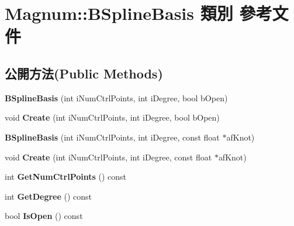 \hypertarget{class_magnum_1_1_b_spline_basis}{}\section{Magnum\+:\+:B\+Spline\+Basis 類別 參考文件}
\label{class_magnum_1_1_b_spline_basis}
\subsection*{公開方法(Public Methods)}
\begin{DoxyCompactItemize}
\item 
{\bfseries B\+Spline\+Basis} (int i\+Num\+Ctrl\+Points, int i\+Degree, bool b\+Open)\hypertarget{class_magnum_1_1_b_spline_basis_a49f9d1a3059e81d71e17940717570d98}{}\label{class_magnum_1_1_b_spline_basis_a49f9d1a3059e81d71e17940717570d98}

\item 
void {\bfseries Create} (int i\+Num\+Ctrl\+Points, int i\+Degree, bool b\+Open)\hypertarget{class_magnum_1_1_b_spline_basis_ac5290de6ab3f20b5943bf196a4bc644d}{}\label{class_magnum_1_1_b_spline_basis_ac5290de6ab3f20b5943bf196a4bc644d}

\item 
{\bfseries B\+Spline\+Basis} (int i\+Num\+Ctrl\+Points, int i\+Degree, const float $\ast$af\+Knot)\hypertarget{class_magnum_1_1_b_spline_basis_a63e34b1a89d5d921a31d0e2584be0359}{}\label{class_magnum_1_1_b_spline_basis_a63e34b1a89d5d921a31d0e2584be0359}

\item 
void {\bfseries Create} (int i\+Num\+Ctrl\+Points, int i\+Degree, const float $\ast$af\+Knot)\hypertarget{class_magnum_1_1_b_spline_basis_aa58aef7fbc39e14e5ca16dcb1be49582}{}\label{class_magnum_1_1_b_spline_basis_aa58aef7fbc39e14e5ca16dcb1be49582}

\item 
int {\bfseries Get\+Num\+Ctrl\+Points} () const \hypertarget{class_magnum_1_1_b_spline_basis_a595ce6fd2057473e902749740ba187a2}{}\label{class_magnum_1_1_b_spline_basis_a595ce6fd2057473e902749740ba187a2}

\item 
int {\bfseries Get\+Degree} () const \hypertarget{class_magnum_1_1_b_spline_basis_a1c393145e2f8e9ecdbec747f3a773f76}{}\label{class_magnum_1_1_b_spline_basis_a1c393145e2f8e9ecdbec747f3a773f76}

\item 
bool {\bfseries Is\+Open} () const \hypertarget{class_magnum_1_1_b_spline_basis_a9bcdcca1769224daa62609f03d6cd0b0}{}\label{class_magnum_1_1_b_spline_basis_a9bcdcca1769224daa62609f03d6cd0b0}


\end{DoxyCompactItemize}
